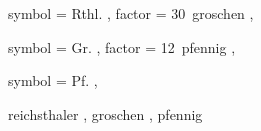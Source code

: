 
 {
	symbol = { Rthl. } ,
	factor = { 30~groschen } ,
}

 {
	symbol = { Gr. } ,
	factor = { 12~pfennig } ,
}

 {
	symbol = { Pf. } ,
}

 {
	reichsthaler ,
	groschen ,
	pfennig
}